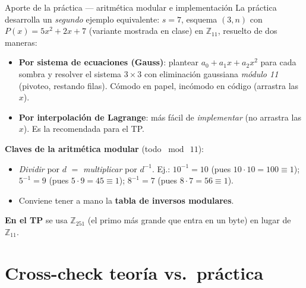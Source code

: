 \documentclass[11pt,a4paper]{article}
\begin{document}
\begin{practbox}{Aporte de la práctica — aritmética modular e implementación}
La práctica desarrolla un \emph{segundo} ejemplo equivalente: $s=7$, esquema $(3,n)$ con
$P(x)=5x^2+2x+7$ (variante mostrada en clase) en $\mathbb{Z}_{11}$, resuelto de dos maneras:
\begin{itemize}[leftmargin=1.4em,itemsep=1pt]
  \item \textbf{Por sistema de ecuaciones (Gauss)}: plantear $a_0 + a_1 x + a_2 x^2$ para cada
        sombra y resolver el sistema $3\times 3$ con eliminación gaussiana \emph{módulo 11}
        (pivoteo, restando filas). Cómodo en papel, incómodo en código (arrastra las $x$).
  \item \textbf{Por interpolación de Lagrange}: más fácil de \emph{implementar} (no arrastra
        las $x$). Es la recomendada para el TP.
\end{itemize}
\textbf{Claves de la aritmética modular} (todo $\bmod\ 11$):
\begin{itemize}[leftmargin=1.4em,itemsep=1pt]
  \item \emph{Dividir} por $d$ $=$ \emph{multiplicar} por $d^{-1}$. Ej.: $10^{-1}=10$ (pues
        $10\cdot 10 = 100 \equiv 1$); $5^{-1}=9$ (pues $5\cdot 9 = 45 \equiv 1$);
        $8^{-1}=7$ (pues $8\cdot 7 = 56 \equiv 1$).
  \item Conviene tener a mano la \textbf{tabla de inversos modulares}.
\end{itemize}
\textbf{En el TP} se usa $\mathbb{Z}_{251}$ (el primo más grande que entra en un byte) en
lugar de $\mathbb{Z}_{11}$.
\end{practbox}

\section{Cross-check teoría vs.\ práctica}
\end{document}
